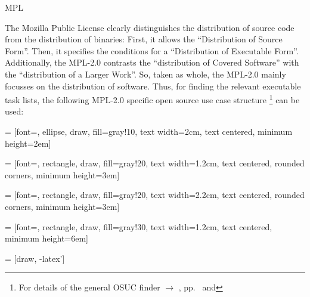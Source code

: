 \begin{license}{MPL} %

The Mozilla Public License clearly distinguishes the distribution of source code
from the distribution of binaries: First, it allows the \enquote{Distribution of
Source Form}. Then, it specifies the conditions for a
\enquote{Distribution of Executable Form}. Additionally, the
MPL-2.0 contrasts the \enquote{distribution of Covered Software} with the
\enquote{distribution of a Larger Work}. So, taken as whole, the
MPL-2.0 mainly focusses on the distribution of software. Thus, for finding the
relevant executable task lists, the following MPL-2.0 specific open source use
case structure%
  \footnote{For details of the general OSUC finder $\rightarrow$ \oslic, 
    pp.\ \pageref{OsucTokens} and \pageref{OsucDefinitionTree}} 
can be used:
 
 = [font=\small, ellipse, draw, fill=gray!10, 
    text width=2cm, text centered, minimum height=2em]

 = [font=\footnotesize, rectangle, draw, fill=gray!20, 
    text width=1.2cm, text centered, rounded corners, minimum height=3em]

 = [font=\footnotesize, rectangle, draw, fill=gray!20, 
    text width=2.2cm, text centered, rounded corners, minimum height=3em]
    
 = [font=\tiny, rectangle, draw, fill=gray!30, 
    text width=1.2cm, text centered, minimum height=6em]

 = [draw, -latex']

\end{license}
